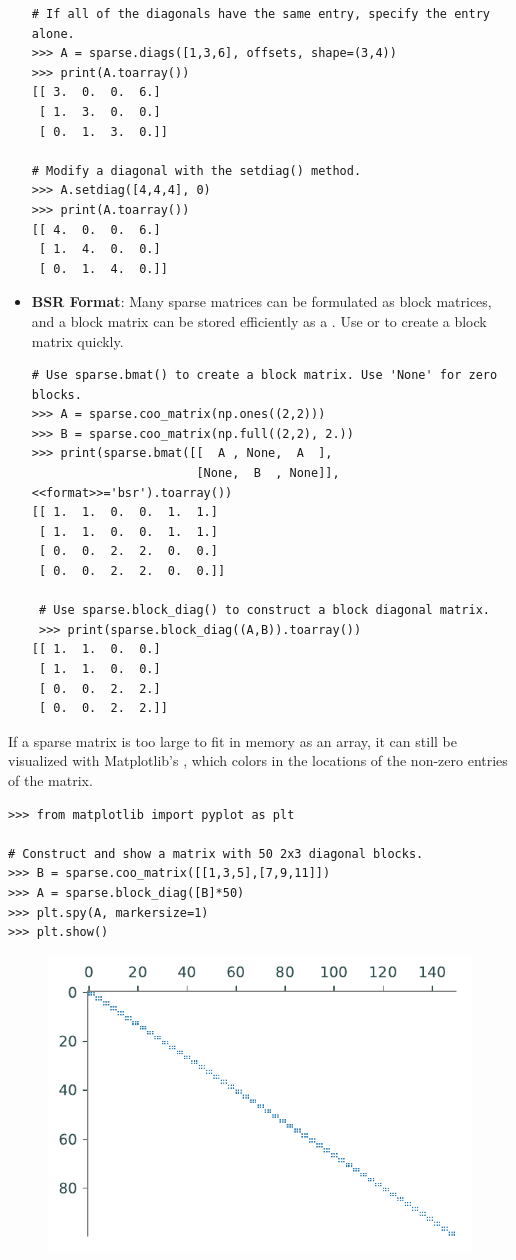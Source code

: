 \begin{itemize}
\begin{lstlisting}
# If all of the diagonals have the same entry, specify the entry alone.
>>> A = sparse.diags([1,3,6], offsets, shape=(3,4))
>>> print(A.toarray())
[[ 3.  0.  0.  6.]
 [ 1.  3.  0.  0.]
 [ 0.  1.  3.  0.]]

# Modify a diagonal with the setdiag() method.
>>> A.setdiag([4,4,4], 0)
>>> print(A.toarray())
[[ 4.  0.  0.  6.]
 [ 1.  4.  0.  0.]
 [ 0.  1.  4.  0.]]
\end{lstlisting}

\item \textbf{BSR Format}: Many sparse matrices can be formulated as block matrices, and a block matrix can be stored efficiently as a .
Use  or  to create a block matrix quickly.
\begin{lstlisting}
# Use sparse.bmat() to create a block matrix. Use 'None' for zero blocks.
>>> A = sparse.coo_matrix(np.ones((2,2)))
>>> B = sparse.coo_matrix(np.full((2,2), 2.))
>>> print(sparse.bmat([[  A , None,  A  ],
                       [None,  B  , None]], <<format>>='bsr').toarray())
[[ 1.  1.  0.  0.  1.  1.]
 [ 1.  1.  0.  0.  1.  1.]
 [ 0.  0.  2.  2.  0.  0.]
 [ 0.  0.  2.  2.  0.  0.]]

 # Use sparse.block_diag() to construct a block diagonal matrix.
 >>> print(sparse.block_diag((A,B)).toarray())
[[ 1.  1.  0.  0.]
 [ 1.  1.  0.  0.]
 [ 0.  0.  2.  2.]
 [ 0.  0.  2.  2.]]
 \end{lstlisting}
\end{itemize}

\begin{info} %
If a sparse matrix is too large to fit in memory as an array, it can still be visualized with Matplotlib's , which colors in the locations of the non-zero entries of the matrix.
\begin{lstlisting}
>>> from matplotlib import pyplot as plt

# Construct and show a matrix with 50 2x3 diagonal blocks.
>>> B = sparse.coo_matrix([[1,3,5],[7,9,11]])
>>> A = sparse.block_diag([B]*50)
>>> plt.spy(A, markersize=1)
>>> plt.show()
\end{lstlisting}
%
\begin{figure}[H]
    \includegraphics[width=.7\textwidth]{figures/spydemo.pdf}
\end{figure}
\end{info}

